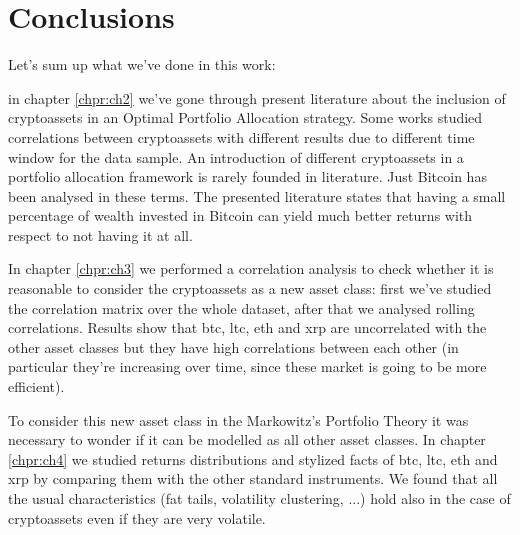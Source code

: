 \chapter{Conclusions}
\label{chpr:ch6}
\bigskip

Let's sum up what we've done in this work:
\bigskip    

in chapter \ref{chpr:ch2} we've gone through present literature about the inclusion of cryptoassets in an Optimal Portfolio Allocation strategy. Some works studied correlations between cryptoassets with different results due to different time window for the data sample. An introduction of different cryptoassets in a portfolio allocation framework is rarely founded in literature. Just Bitcoin has been analysed in these terms. The presented literature states that having a small percentage of wealth invested in Bitcoin can yield much better returns with respect to not having it at all.

\bigskip
In chapter \ref{chpr:ch3} we performed a correlation analysis to check whether it is reasonable to consider the cryptoassets as a new asset class: first we've studied the correlation matrix over the whole dataset, after that we analysed rolling correlations. Results show that btc, ltc, eth and xrp are uncorrelated with the other asset classes but they have high correlations between each other (in particular they're increasing over time, since these market is going to be more efficient). 

\bigskip
To consider this new asset class in the Markowitz's Portfolio Theory it was necessary to wonder if it can be modelled as all other asset classes. In chapter \ref{chpr:ch4} we studied returns distributions and stylized facts of btc, ltc, eth and xrp by comparing them with the other standard instruments. We found that all the usual characteristics (fat tails, volatility clustering, ...) hold also in the case of cryptoassets even if they are very volatile.

